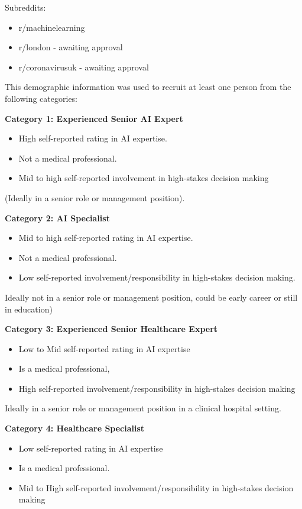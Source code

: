 \documentclass[manuscript,screen,review]{acmart}
\begin{document}
Subreddits:
\begin{itemize}
    \item r/machinelearning
    \item r/london - awaiting approval
    \item r/coronavirusuk - awaiting approval
\end{itemize}

This demographic information was used to recruit at least one person from the following categories:

\textbf{Category 1: Experienced Senior AI Expert}
\begin{itemize}
\item High self-reported rating in AI expertise.
\item Not a medical professional.
\item Mid to high self-reported involvement in high-stakes decision making
\end{itemize}
(Ideally in a senior role or management position).

\textbf{Category 2: AI Specialist}
\begin{itemize}
\item Mid to high self-reported rating in AI expertise.
\item Not a medical professional.
\item Low self-reported involvement/responsibility in high-stakes decision making.
\end{itemize}

Ideally not in a senior role or management position, could be early career or still in education)

\textbf{Category 3: Experienced Senior Healthcare Expert}
\begin{itemize}
\item Low to Mid self-reported rating in AI expertise
\item Is a medical professional, 
\item High self-reported involvement/responsibility in high-stakes decision making
\end{itemize}

Ideally in a senior role or management position in a clinical hospital setting.

\textbf{Category 4: Healthcare Specialist}
\begin{itemize}
\item Low self-reported rating in AI expertise
\item Is a medical professional.
\item Mid to High self-reported involvement/responsibility in high-stakes decision making
\end{itemize}
\end{document}
